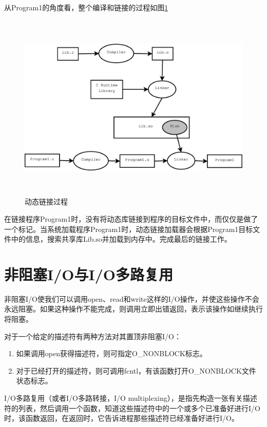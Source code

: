 \documentclass[12pt, twoside, a4paper, xetex]{report}
\begin{document}
	从Program1的角度看，整个编译和链接的过程如图\ref{solink}
	\begin{figure}[htbp]
	\centering
	\setlength{\abovecaptionskip}{0pt}
	\setlength{\belowcaptionskip}{10pt}
	\caption{动态链接过程}
	\label{solink}
	\includegraphics[height=9cm, width=15cm]{pics/solink.eps}
	\end{figure}
	
	在链接程序Program1时，没有将动态库链接到程序的目标文件中，而仅仅是做了一个标记。当系统加载程序Program1时，动态链接加载器会根据Program1目标文件中的信息，搜索共享库Lib.so并加载到内存中。完成最后的链接工作。
	
\section{非阻塞I/O与I/O多路复用}
	非阻塞I/O使我们可以调用open、read和write这样的I/O操作，并使这些操作不会永远阻塞。如果这种操作不能完成，则调用立即出错返回，表示该操作如继续执行将阻塞。
	
	对于一个给定的描述符有两种方法对其置顶非阻塞I/O：
	\begin{enumerate}
		\item 如果调用open获得描述符，则可指定O\_NONBLOCK标志。
		\item 对于已经打开的描述符，则可调用fcntl，有该函数打开O\_NONBLOCK文件状态标志。
	\end{enumerate}
	
	I/O多路复用（或者I/O多路转接，I/O multiplexing），是指先构造一张有关描述符的列表，然后调用一个函数，知道这些描述符中的一个或多个已准备好进行I/O时，该函数返回，在返回时，它告诉进程那些描述符已经准备好进行I/O。
	
\end{document}
